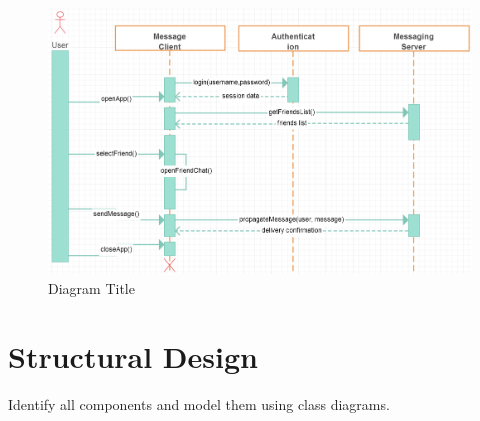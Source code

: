 \documentclass{article}
\begin{document}
\begin{figure}[H]
	\begin{center}
		\caption{Diagram Title}
		\label{}
		\includegraphics[width=\textwidth]{images/sample-sequence-diagram.png}
	\end{center}
\end{figure}

\clearpage

\section{Structural Design}

Identify all components and model them using class diagrams.
\end{document}
